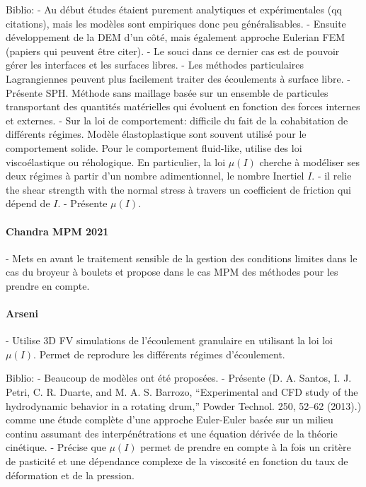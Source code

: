 Biblio:
- Au début études étaient purement analytiques et expérimentales (qq citations), mais les modèles sont empiriques donc peu généralisables.
- Ensuite développement de la DEM d'un côté, mais également approche Eulerian FEM (papiers qui peuvent être citer).
- Le souci dans ce dernier cas est de pouvoir gérer les interfaces et les surfaces libres.
- Les méthodes particulaires Lagrangiennes peuvent plus facilement traiter des écoulements à surface libre.
- Présente SPH. Méthode sans maillage basée sur un ensemble de particules transportant des quantités matérielles qui évoluent en fonction des forces internes et externes.
- Sur la loi de comportement: difficile du fait de la cohabitation de différents régimes. Modèle élastoplastique sont souvent utilisé pour le comportement solide. Pour le comportement fluid-like, utilise des loi viscoélastique ou réhologique. En particulier, la loi $\mu (I)$ cherche à modéliser ses deux régimes à partir d'un nombre adimentionnel, le nombre Inertiel $I$.
- il relie the shear strength with the normal stress à travers un coefficient de friction qui dépend de $I$.
- Présente $\mu(I)$.

\paragraph*{Chandra MPM 2021}
- Mets en avant le traitement sensible de la gestion des conditions limites dans le cas du broyeur à boulets et propose dans le cas MPM des méthodes pour les prendre en compte.

\paragraph*{Arseni}
- Utilise 3D FV simulations de l'écoulement granulaire en utilisant la loi loi $\mu(I)$. Permet de reprodure les différents régimes d'écoulement.

Biblio:
- Beaucoup de modèles ont été proposées.
- Présente (D. A. Santos, I. J. Petri, C. R. Duarte, and M. A. S. Barrozo, “Experimental and CFD study of the hydrodynamic behavior in a rotating drum,” Powder Technol. 250, 52–62 (2013).) comme une étude complète d'une approche Euler-Euler basée sur un milieu continu assumant des interpénétrations et une équation dérivée de la théorie cinétique.
- Précise que $\mu(I)$ permet de prendre en compte à la fois un critère de pasticité et une dépendance complexe de la viscosité en fonction du taux de déformation et de la pression.